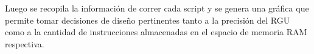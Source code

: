 Luego se recopila la información de correr cada script y se genera una gráfica que permite tomar decisiones de diseño pertinentes tanto a la precisión del RGU como a la cantidad de instrucciones almacenadas en el espacio de memoria RAM respectiva.
\begin{comment}

\subsection{Modelo MVC}

El patrón de diseño MVC es uno de los más populares para la creación de aplicaciones, tanto de escritorio como web. Esto debido a que permite que los componentes de la arquitectura del software puedan variar de manera casi independiente y aún así seguir proveyendo una correcta funcionalidad a la aplicación. De esta manera, no solo se puede hacer un diseño limpio y fácil de entender y depurar, sino que es más fácil realizar actualizaciones y darles mantenimiento, ya que si algo falla, es bastante evidente cual de los componentes es el que está fallando. Además, el MVC facilita la programación orientada a objetos, paradigma que ya se tiene en HTML5 con los DOM, por lo que es apropiado utilizarlo. \\

Para seguir este patrón las divisiones se realizaron de la siguiente manera:

\begin{enumerate}
\item Los Views están compuestos por los diferentes archivos en el lenguaje HTML5 que le permiten al usuario visualizar en su navegador la aplicación y poder interactuar con la misma.

\item Los Controllers son varios archivos en JavaScript, utilizando el framework AngularJS, que permiten dar funciones específicas a las interacciones que tiene el usuario con los Views. Los controllers envían peticiones HTTP, como los son los POSTs, GETs, PUTs para modificar los contenidos del Model.


\end{comment}
